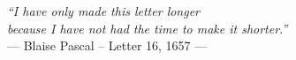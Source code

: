 \thispagestyle{empty}
\vspace*{3cm}

\begin{center}
\emph{``I have only made this letter longer\\
because I have not had the time to make it shorter.''}\\
--- Blaise Pascal -- Letter 16, 1657 ---
\end{center}

\medskip
